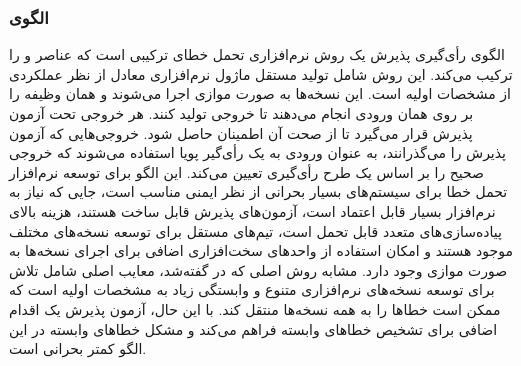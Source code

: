 \subsubsection{الگوی }
\label{ArmoushSWAccVoteSec}
\begin{RTL}
الگوی رأی‌گیری پذیرش \cite{ref5}
 یک روش نرم‌افزاری تحمل خطای
ترکیبی است که عناصر  
و   را
ترکیب می‌کند. این روش شامل تولید مستقل 
ماژول‌ نرم‌افزاری معادل از نظر عملکردی از مشخصات اولیه است.
این نسخه‌ها به صورت موازی اجرا می‌شوند و همان وظیفه را بر روی
همان ورودی انجام می‌دهند تا  خروجی تولید کنند.
هر خروجی تحت آزمون پذیرش قرار می‌گیرد تا از صحت آن اطمینان
حاصل شود. خروجی‌هایی که آزمون پذیرش را می‌گذرانند، به عنوان ورودی
به یک رأی‌گیر پویا استفاده می‌شوند که خروجی صحیح
را بر اساس یک طرح رأی‌گیری تعیین می‌کند.
این الگو برای توسعه نرم‌افزار تحمل خطا برای سیستم‌های بسیار بحرانی
از نظر ایمنی مناسب است، جایی که نیاز به
نرم‌افزار بسیار قابل اعتماد است، آزمون‌های پذیرش
قابل ساخت هستند، هزینه بالای پیاده‌سازی‌های متعدد قابل تحمل
است، تیم‌های مستقل برای توسعه نسخه‌های مختلف موجود هستند و
امکان استفاده از واحدهای سخت‌افزاری اضافی برای اجرای نسخه‌ها
به صورت موازی وجود دارد. مشابه روش
اصلی که در 
گفته‌شد، معایب اصلی  شامل
تلاش برای توسعه نسخه‌های نرم‌افزاری متنوع و وابستگی زیاد به مشخصات
اولیه است که ممکن است خطاها را به همه نسخه‌ها منتقل کند.
با این حال، آزمون پذیرش یک اقدام اضافی برای تشخیص خطاهای
وابسته فراهم می‌کند و مشکل خطاهای وابسته در این الگو کمتر بحرانی است.
\end{RTL}